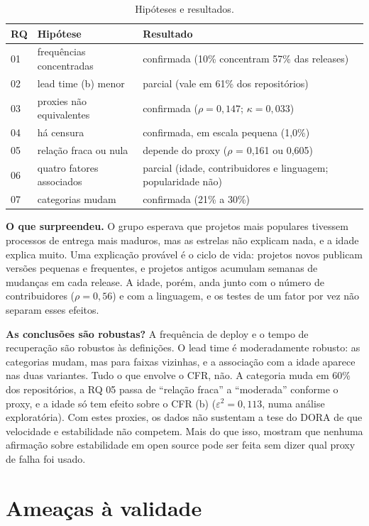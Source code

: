 \documentclass[12pt]{article}
\begin{document}
\begin{table}[ht]
\centering
\caption{Hipóteses e resultados.}
\label{tab:hipoteses}
\small
\begin{tabular}{lll}
\hline
RQ & Hipótese & Resultado \\
\hline
01 & frequências concentradas & confirmada (10\% concentram 57\% das releases) \\
02 & lead time (b) menor & parcial (vale em 61\% dos repositórios) \\
03 & proxies não equivalentes & confirmada ($\rho = 0{,}147$; $\kappa = 0{,}033$) \\
04 & há censura & confirmada, em escala pequena (1,0\%) \\
05 & relação fraca ou nula & depende do proxy ($\rho$ = 0,161 ou 0,605) \\
06 & quatro fatores associados & parcial (idade, contribuidores e linguagem; popularidade não) \\
07 & categorias mudam & confirmada (21\% a 30\%) \\
\hline
\end{tabular}
\end{table}

\textbf{O que surpreendeu.} O grupo esperava que projetos mais populares tivessem processos de entrega mais maduros, mas as estrelas não explicam nada, e a idade explica muito. Uma explicação provável é o ciclo de vida: projetos novos publicam versões pequenas e frequentes, e projetos antigos acumulam semanas de mudanças em cada release. A idade, porém, anda junto com o número de contribuidores ($\rho = 0{,}56$) e com a linguagem, e os testes de um fator por vez não separam esses efeitos.

\textbf{As conclusões são robustas?} A frequência de deploy e o tempo de recuperação são robustos às definições. O lead time é moderadamente robusto: as categorias mudam, mas para faixas vizinhas, e a associação com a idade aparece nas duas variantes. Tudo o que envolve o CFR, não. A categoria muda em 60\% dos repositórios, a RQ 05 passa de ``relação fraca'' a ``moderada'' conforme o proxy, e a idade só tem efeito sobre o CFR (b) ($\varepsilon^2 = 0{,}113$, numa análise exploratória). Com estes proxies, os dados não sustentam a tese do DORA de que velocidade e estabilidade não competem. Mais do que isso, mostram que nenhuma afirmação sobre estabilidade em open source pode ser feita sem dizer qual proxy de falha foi usado.

\section{Ameaças à validade}
\end{document}
